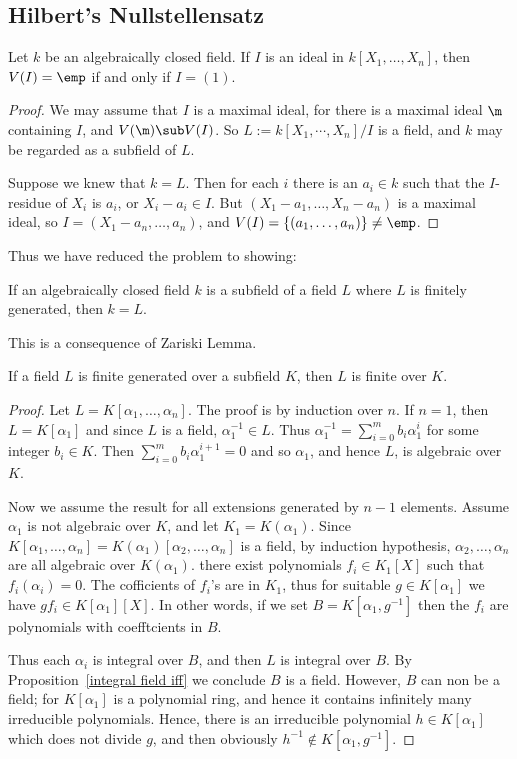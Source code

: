 \subsection{Hilbert's Nullstellensatz}
\begin{theorem}
Let $k$ be an algebraically closed field. If $I$ is an ideal in $k[X_1,\dots,X_n]$, then $V(I)=\emp$ if and only if $I=(1)$.
\end{theorem}
\begin{proof}
We may assume that $I$ is a maximal ideal, for there is a maximal ideal $\m$ containing $I$, and $V(\m)\sub V(I)$. So $L:=k[X_1,\cdots,X_n]/I$ is a field, and $k$ may be regarded as a subfield of $L$.\par
Suppose we knew that $k=L$. Then for each $i$ there is an $a_i\in k$ such that the $I$-residue of $X_i$ is $a_i$, or $X_i-a_i\in I$. But $(X_1-a_1,\dots,X_n-a_n)$ is a maximal ideal, so $I=(X_1-a_n,\dots,a_n)$, and $V(I)=\{(a_1,\dots,a_n)\}\neq\emp$.
\end{proof}
Thus we have reduced the problem to showing:
\begin{proposition}
If an algebraically closed field $k$ is a subfield of a field $L$ where $L$ is finitely generated, then $k=L$.
\end{proposition}
This is a consequence of Zariski Lemma.
\begin{theorem}\label{Zariski lemma}
If a field $L$ is finite generated over a subfield $K$, then $L$ is finite over $K$.
\end{theorem}
\begin{proof}
Let $L=K[\alpha_1,\dots,\alpha_n]$. The proof is by induction over $n$. If $n=1$, then $L=K[\alpha_1]$ and since $L$ is a field, $\alpha_1^{-1}\in L$. Thus $\alpha_1^{-1}=\sum_{i=0}^mb_i\alpha_1^i$ for some integer $b_i \in K$. Then $\sum_{i=0}^mb_i\alpha_1^{i+1}=0$ and so $\alpha_1$, and hence $L$, is algebraic over $K$.\par
Now we assume the result for all extensions generated by $n-1$ elements. Assume $\alpha_1$ is not algebraic over $K$, and let $K_1=K(\alpha_1)$. Since
$K[\alpha_1,\dots,\alpha_n]=K(\alpha_1)[\alpha_2,\dots,\alpha_n]$ is a field, by induction hypothesis, $\alpha_2,\dots,\alpha_n$ are all algebraic over $K(\alpha_1)$. there exist polynomials $f_i\in K_1[X]$ such that $f_i(\alpha_i)=0$. The cofficients of $f_i$'s are in $K_1$, thus for suitable $g\in K[\alpha_1]$ we have $gf_i\in K[\alpha_1][X]$. In other words, if we set $B=K[\alpha_1,g^{-1}]$ then the $f_i$ are polynomials with coefftcients in $B$.\par 
Thus each $\alpha_i$ is integral over $B$, and then $L$ is integral over $B$. By Proposition~\ref{integral field iff} we conclude $B$ is a field. However, $B$ can non be a field; for $K[\alpha_1]$ is a polynomial ring, and hence it contains infinitely many irreducible polynomials. Hence, there is an irreducible polynomial $h\in K[\alpha_1]$ which does not divide $g$, and then obviously $h^{-1}\notin K[\alpha_1,g^{-1}]$.
\end{proof}
